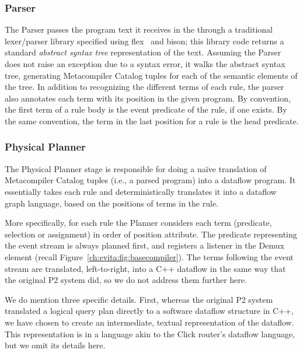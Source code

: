 \subsubsection{Parser}

The Parser passes the program text it receives in the 
through a traditional lexer/parser library specified using
flex~\cite{flexUrl} and bison\cite{bisonUrl}; this library code returns
a standard {\em abstract syntax tree} representation of the text.
Assuming the Parser does not raise an exception due to a syntax error,
it walks the abstract syntax tree, generating Metacompiler Catalog
tuples for each of the semantic elements of the tree. In addition to
recognizing the different terms of each rule, the parser also annotates
each term with its position in the given program.  By convention, the
first term of a rule body is the event predicate of the rule, if one
exists.  By the same convention, the term in the last position for a
rule is the head predicate.



\subsubsection{Physical Planner}
\label{ch:evita:sec:planner}

The Physical Planner stage is responsible for doing a na\"{i}ve
translation of Metacompiler Catalog tuples (i.e., a parsed \OVERLOG program) into a dataflow program. It essentially takes each rule and deterministically translates it into a dataflow graph language, based on the positions of terms in the rule.

More specifically, for each rule the Planner considers each term
(predicate, selection or assignment) in order of position attribute.
The predicate representing the event stream is always planned first,
and registers a listener in the Demux element (recall
Figure~\ref{ch:evita:fig:basecompiler}).  The terms following the event stream
are translated, left-to-right, into a C++ dataflow in the same way that
the original P2 system did, so we do not address them further here.

We do mention three specific details. First, whereas the original P2
system translated a logical query plan directly to a software dataflow
structure in C++, we have chosen to create an intermediate, textual
representation of the dataflow. This representation is in a language
akin to the Click router's dataflow language, but we omit its details here. 

